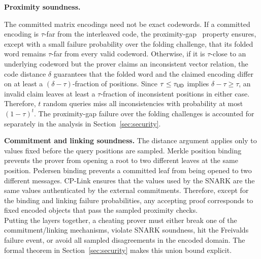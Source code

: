 \noindent\textbf{Proximity soundness.}
\begin{revblock}
  The committed matrix encodings need not be exact codewords. If a committed
encoding is $\tau$-far from the interleaved code, the proximity-gap~\cite{proximity_gaps} property
ensures, except with a small failure probability over the folding challenge,
that its folded word remains $\tau$-far from every valid codeword.
Otherwise, if it is $\tau$-close to an underlying codeword but the prover
claims an inconsistent vector relation, the code distance $\delta$ guarantees
that the folded word and the claimed encoding differ on at least a
$(\delta-\tau)$-fraction of positions. Since
$\tau\leq\tau_{{\mathsf{UD}}}$ implies $\delta-\tau\geq\tau$, an invalid claim leaves
at least a $\tau$-fraction of inconsistent positions in either case. Therefore, $t$ random queries miss all inconsistencies with probability at
most $(1-\tau)^t$.
The proximity-gap failure over the folding challenges is accounted for
separately in the analysis in Section~\ref{sec:security}. \\
\end{revblock}

\noindent\textbf{Commitment and linking soundness.}
The distance argument applies only to values fixed before the query positions
are sampled.  Merkle position binding prevents the prover from opening a root
to two different leaves at the same position.  Pedersen binding prevents a
committed leaf from being opened to two different messages.  CP-Link ensures
that the values used by the SNARK are the same values authenticated by the
external commitments.  Therefore, except for the binding and linking failure
probabilities, any accepting proof corresponds to fixed encoded objects that
pass the sampled proximity checks. \\

Putting the layers together, a cheating prover must either break one of the
commitment/linking mechanisms, violate SNARK soundness, hit the Freivalds
failure event, or avoid all sampled disagreements in the encoded domain.  The
formal theorem in Section~\ref{sec:security} makes this union bound explicit.
